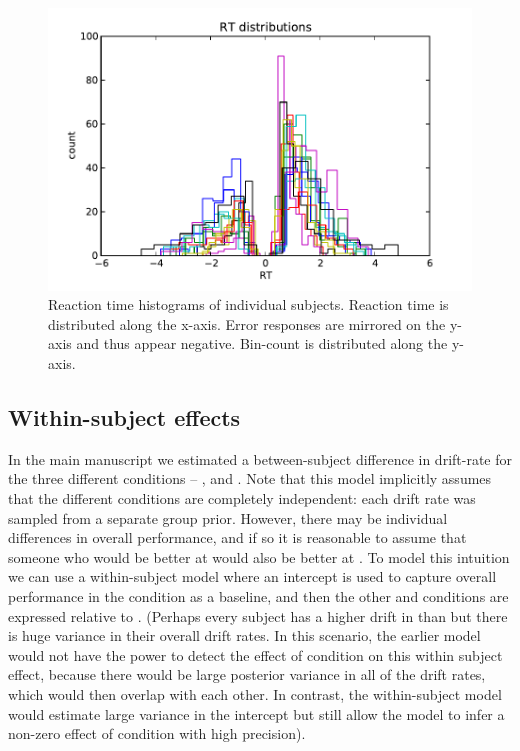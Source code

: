 \documentclass[letterpaper,10pt,english]{article}
\begin{document}
\begin{figure}
\includegraphics[scale=0.6]{hddm_demo_fig_00.pdf}
\caption{Reaction time histograms of individual subjects. Reaction time is distributed along the x-axis. Error responses are mirrored on the y-axis and thus appear negative. Bin-count is distributed along the y-axis.}
\label{fig.rt_histograms}
\end{figure}


\subsection*{Within-subject effects}
\label{demo:within-subject-effects}
In the main manuscript we estimated a between-subject difference in drift-rate for the three different conditions -- ,  and . Note that this model implicitly assumes that the different conditions are completely independent:  each drift rate was sampled from a separate group prior. However, there may be individual differences in overall performance, and if so it is reasonable to assume that someone who would be better at  would also be better at . To model this intuition we can use a within-subject model where an intercept is used to capture overall performance in the  condition as a baseline, and then the other  and  conditions are expressed relative to . (Perhaps every subject has a higher drift in  than  but there is huge variance in their overall drift rates. In this scenario, the earlier model would not have the power to detect the effect of condition on this within subject effect, because there would be large posterior variance in all of the drift rates, which would then overlap with each other.  In contrast, the within-subject model would estimate large variance in the intercept but still allow the model to infer a non-zero effect of condition with high precision).
\end{document}

